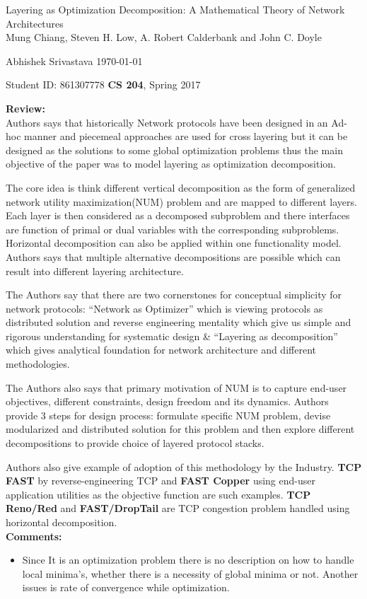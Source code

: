 \documentclass[a4paper,12pt, twoside]{article}
\renewcommand{\maketitle}{%
 	\Large
 	\begin{center}
 	Layering as Optimization Decomposition: A Mathematical Theory of Network Architectures\\	
 	\normalsize Mung Chiang, Steven H. Low, A. Robert Calderbank and John C. Doyle
 	\end{center}
 
 	\Large
	Abhishek Srivastava
	\hfill
	\normalsize
	\today
 	\par
 	Student ID: 861307778
 	\hfill
 	\textbf{CS 204}, Spring 2017
 	\par 	
 	\hrulefill
 	\par
 	}
\begin{document}
\thispagestyle{empty}
	
\maketitle

\textbf{Review:}\\

Authors says that historically Network protocols have been designed in an Ad-hoc manner and piecemeal approaches are used for cross layering but it can be designed as the solutions to some global optimization problems thus the main objective of the paper was to model layering as optimization decomposition. 

The core idea is think different vertical decomposition as the form of generalized network utility maximization(NUM) problem and are mapped to different layers. Each layer is then considered as a decomposed subproblem and there interfaces are function of primal or dual variables with the corresponding subproblems. Horizontal decomposition can also be applied within one functionality model. Authors says that multiple alternative decompositions are possible which can result into different layering architecture.

The Authors say that there are two cornerstones for conceptual simplicity for network protocols: ``Network as Optimizer'' which is viewing protocols as distributed solution and reverse engineering mentality which give us simple and rigorous understanding for systematic design \& ``Layering as decomposition'' which gives analytical foundation for network architecture and different methodologies.  

The Authors also says that primary motivation of NUM is to capture end-user objectives, different constraints, design freedom and its dynamics. Authors provide 3 steps for design process: formulate specific NUM problem, devise modularized and distributed solution for this problem and then explore different decompositions to provide choice of layered protocol stacks.

Authors also give example of adoption of this methodology by the Industry. \textbf{TCP FAST} by reverse-engineering TCP and \textbf{FAST Copper} using end-user application utilities as the objective function are such examples. \textbf{TCP Reno/Red} and \textbf{FAST/DropTail} are TCP congestion problem handled using horizontal decomposition.\\

\textbf{Comments:}
\begin{itemize}
	\item Since It is an optimization problem there is no description on how to handle local minima's, whether there is a necessity of global minima or not. Another issues is rate of convergence while optimization.
\end{itemize}
\end{document}
